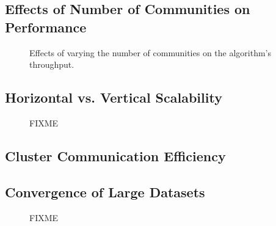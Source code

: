 \subsection{Effects of Number of Communities on Performance}
\begin{figure}[t] %
  \centering
  \caption{Effects of varying the number of communities on the algorithm's
  throughput.}
  \label{fig-throughput}
\end{figure}

\subsection{Horizontal vs. Vertical Scalability}
\begin{figure}[t] %
  \centering
  \caption{FIXME}
  \label{fig-ppx-cpu}
\end{figure}

\subsection{Cluster Communication Efficiency}

\subsection{Convergence of Large Datasets}
\begin{figure*}[t] %
  \centering
  \caption{FIXME}
  \label{fig-ppx-cpu}
\end{figure*}

